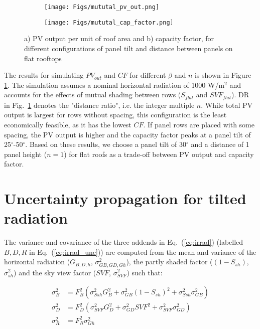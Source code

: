 \begin{figure}[tb]
	\centering
	\begin{subfigure}{.49\textwidth}
		\centering
		\texttt{[image: Figs/mututal\_pv\_out.png]}  
	\end{subfigure}
	\begin{subfigure}{.49\textwidth}
		\centering
		\texttt{[image: Figs/mututal\_cap\_factor.png]}  
	\end{subfigure}
	\caption{a) PV output per unit of roof area and b) capacity factor, for different configurations of panel tilt and distance between panels on flat rooftops}
	\label{fig:flat_panels}
\end{figure}

The results for simulating $\mathit{PV}_{\mathit{out}}$ and $\mathit{CF}$ for different $\beta$ and $n$ is shown in Figure \ref{fig:flat_panels}.
The simulation assumes a nominal horizontal radiation of 1000 W/m$^2$ and accounts for the effects of mutual shading between rows ($S_{\mathit{flat}}$ and $\mathit{SVF}_{\mathit{flat}}$). 
DR in Fig.~\ref{fig:flat_panels} denotes the "distance ratio", i.e. the integer multiple $n$. While total PV output is largest for rows without spacing, this configuration is the least economically feasible, as it has the lowest $\mathit{CF}$. If panel rows are placed with some spacing, the PV output is higher and the capacity factor peaks at a panel tilt of 25$^\circ$-50$^\circ$. 
Based on these results, we choose a panel tilt of 30$^\circ$ and a distance of 1 panel height ($n=1$) for flat roofs as a trade-off between PV output and capacity factor.



\section{Uncertainty propagation for tilted radiation}
\label{unc_Gt}

The variance and covariance of the three addends in Eq.~(\ref{eq:irrad}) (labelled $B, D, R$ in Eq.~(\ref{eq:irrad_unc})) are computed from the mean and variance of the horizontal radiation ($G_{B,D,h}$, $\sigma^2_{GB,GD,Gh}$), the partly shaded factor ($(1-S_{sh})$, $\sigma^2_{sh}$) and the sky view factor ($\mathit{SVF}$, $\sigma^2_{\mathit{SVF}}$) such that:

\begin{equation}
\begin{aligned}
\sigma^2_{B} & = F_{B}^2 (\sigma^2_{\mathit{Ssh}} G_B^2 + \sigma^2_{GB} (1-S_{sh})^2 + \sigma^2_{\mathit{Ssh}} \sigma^2_{GB}) \\
\sigma^2_{D} & = F_{D}^2 (\sigma^2_{\mathit{SVF}} G_D^2 + \sigma^2_{GD} \mathit{SVF}^2 + \sigma^2_{\mathit{SVF}} \sigma^2_{GD}) \\
\sigma^2_{R}&  = F_{R}^2 \sigma^2_{Gh}
\end{aligned}
\end{equation}

